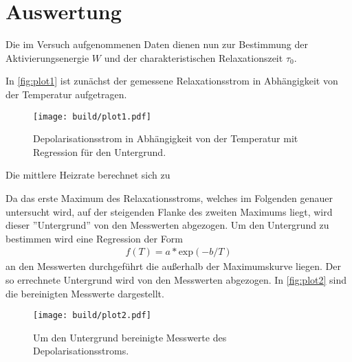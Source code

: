 \section{Auswertung}
\label{sec:Auswertung}

Die im Versuch aufgenommenen Daten dienen nun zur Bestimmung der Aktivierungsenergie $W$ und der charakteristischen Relaxationszeit $\tau_0$.

In \autoref{fig:plot1} ist zunächst der gemessene Relaxationsstrom in Abhängigkeit von der Temperatur aufgetragen.

\begin{figure}[H]
  \centering
  \texttt{[image: build/plot1.pdf]}
  \caption{Depolarisationsstrom in Abhängigkeit von der Temperatur mit Regression für den Untergrund.}
  \label{fig:plot1}
\end{figure}

Die mittlere Heizrate berechnet sich zu

Da das erste Maximum des Relaxationsstroms, welches im Folgenden genauer
untersucht wird, auf der steigenden Flanke des zweiten Maximums liegt, wird dieser
”Untergrund” von den Messwerten abgezogen.
Um den Untergrund zu bestimmen wird eine Regression der Form
\begin{align*}
  f(T)= a * \text{exp}(-b/T)
\end{align*}
an den Messwerten durchgeführt die außerhalb der Maximumskurve liegen.
Der so errechnete Untergrund wird von den Messwerten abgezogen.
In \autoref{fig:plot2} sind die bereinigten Messwerte dargestellt.

\begin{figure}[H]
  \centering
  \texttt{[image: build/plot2.pdf]}
  \caption{Um den Untergrund bereinigte Messwerte des Depolarisationsstroms.}
  \label{fig:plot2}
\end{figure}


